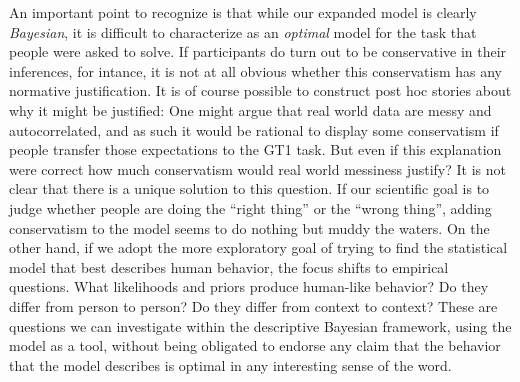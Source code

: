 \documentclass[doc,floatsintext]{apa6}
\begin{document}
An important point to recognize is that while our expanded model is clearly {\it Bayesian}, it is difficult to characterize as an {\it optimal} model for the task that people were asked to solve. If participants do turn out to be conservative in their inferences, for intance, it is not at all obvious whether this conservatism has any normative justification. It is of course possible to construct post hoc stories about why it might be justified: One might argue that real world data are messy and autocorrelated, and as such it would be rational to display some conservatism if people transfer those expectations to the GT1 task. But even if this explanation were correct how much conservatism would real world messiness justify? It is not clear that there is a unique solution to this question. If our scientific goal is to judge whether people are doing the ``right thing'' or the ``wrong thing'', adding conservatism to the model seems to do nothing but muddy the waters. On the other hand, if we adopt the more exploratory goal of trying to find the statistical model that best describes human behavior, the focus shifts to empirical questions. What likelihoods and priors produce human-like behavior? Do they differ from person to person? Do they differ from context to context? These are questions we can investigate within the descriptive Bayesian framework, using the model as a tool, without being obligated to endorse any claim that the behavior that the model describes is optimal in any interesting sense of the word.
\end{document}
